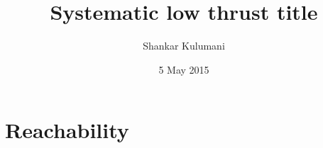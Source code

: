 \documentclass[11pt, reqno]{amsart}   	%
\title{Systematic low thrust title }
\author{Shankar Kulumani}
\date{5 May 2015}							%
\begin{document}
\maketitle




\section{Reachability}


%

\end{document}

